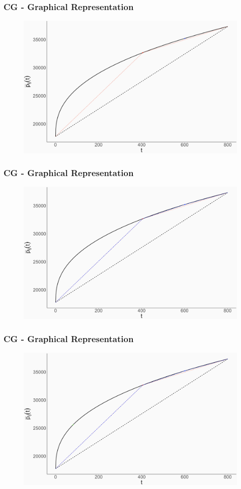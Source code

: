 \documentclass[xcolor=dvipsnames,aspectratio=169, handout, mathserif]{beamer}
\begin{document}
\begin{frame}
\frametitle{CG - Graphical Representation}
\begin{center}
\begin{figure}
    \centering
    \includegraphics[width=0.8\linewidth]{p5.png}
\end{figure}
\end{center}
\end{frame}

\begin{frame}
\frametitle{CG - Graphical Representation}
\begin{center}
\begin{figure}
    \centering
    \includegraphics[width=0.8\linewidth]{p6.png}
\end{figure}
\end{center}
\end{frame}

\begin{frame}
\frametitle{CG - Graphical Representation}
\begin{center}
\begin{figure}
    \centering
    \includegraphics[width=0.8\linewidth]{p7.png}
\end{figure}
\end{center}
\end{frame}
\end{document}
